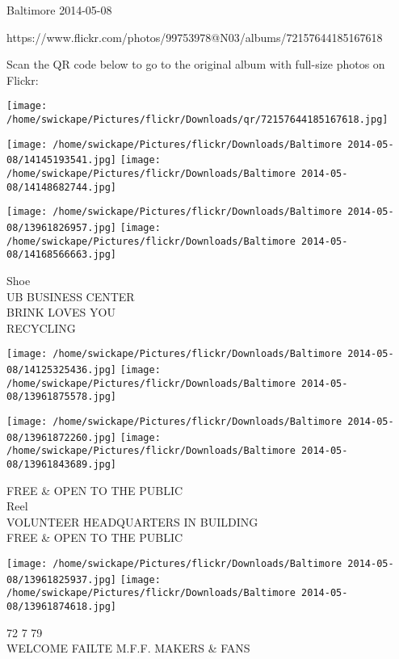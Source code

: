 \documentclass[10pt,letterpaper]{article}
\begin{document}
Baltimore 2014-05-08

https://www.flickr.com/photos/99753978@N03/albums/72157644185167618

Scan the QR code below to go to the original album with full-size photos on Flickr:

\texttt{[image: /home/swickape/Pictures/flickr/Downloads/qr/72157644185167618.jpg]}
\pagebreak

\texttt{[image: /home/swickape/Pictures/flickr/Downloads/Baltimore 2014-05-08/14145193541.jpg]}
\texttt{[image: /home/swickape/Pictures/flickr/Downloads/Baltimore 2014-05-08/14148682744.jpg]}

\texttt{[image: /home/swickape/Pictures/flickr/Downloads/Baltimore 2014-05-08/13961826957.jpg]}
\texttt{[image: /home/swickape/Pictures/flickr/Downloads/Baltimore 2014-05-08/14168566663.jpg]}

Shoe\\
UB BUSINESS CENTER\\
BRINK LOVES YOU\\
RECYCLING\\
\pagebreak

\texttt{[image: /home/swickape/Pictures/flickr/Downloads/Baltimore 2014-05-08/14125325436.jpg]}
\texttt{[image: /home/swickape/Pictures/flickr/Downloads/Baltimore 2014-05-08/13961875578.jpg]}

\texttt{[image: /home/swickape/Pictures/flickr/Downloads/Baltimore 2014-05-08/13961872260.jpg]}
\texttt{[image: /home/swickape/Pictures/flickr/Downloads/Baltimore 2014-05-08/13961843689.jpg]}

FREE \& OPEN TO THE PUBLIC\\
Reel\\
VOLUNTEER HEADQUARTERS IN BUILDING\\
FREE \& OPEN TO THE PUBLIC\\
\pagebreak

\texttt{[image: /home/swickape/Pictures/flickr/Downloads/Baltimore 2014-05-08/13961825937.jpg]}
\texttt{[image: /home/swickape/Pictures/flickr/Downloads/Baltimore 2014-05-08/13961874618.jpg]}

72 7 79\\
WELCOME FAILTE M.F.F. MAKERS \& FANS\\
\pagebreak
\end{document}
